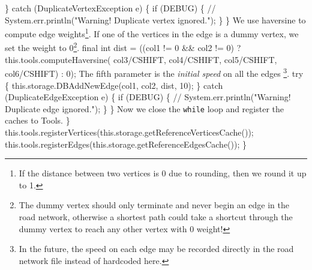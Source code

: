 \} catch (DuplicateVertexException e) \{
  if (DEBUG) \{
    // System.err.println("Warning! Duplicate vertex ignored.");
  \}
\}
\nwendcode{}\nwdocspar
{\small We use haversine to compute edge weights\footnote{If the distance between two
vertices is 0 due to rounding, then we round it up to 1.}.  If one of the
vertices in the edge is a dummy vertex, we set the weight to 0\footnote{The
dummy vertex should only terminate and never begin an edge in the road network,
otherwise a shortest path could take a shortcut through the dummy vertex to
reach any other vertex with 0 weight!}.}
\nwenddocs{}\plusendmoddef
final int dist = ((col1 != 0 && col2 != 0)
  ? this.tools.computeHaversine(
        col3/CSHIFT, col4/CSHIFT,
        col5/CSHIFT, col6/CSHIFT) : 0);
\nwendcode{}\nwdocspar
{\small The fifth parameter is the \textit{initial speed} on all the edges
\footnote{In the future, the speed on each edge may be recorded directly in the
road network file instead of hardcoded here.}.}
\nwenddocs{}\plusendmoddef
try \{
  this.storage.DBAddNewEdge(col1, col2, dist, 10);
\} catch (DuplicateEdgeException e) \{
  if (DEBUG) \{
    // System.err.println("Warning! Duplicate edge ignored.");
  \}
\}
\nwendcode{}\nwdocspar
{\small Now we close the {\tt{}while} loop and register the caches to Tools.}
\nwenddocs{}\plusendmoddef
  \}
  this.tools.registerVertices(this.storage.getReferenceVerticesCache());
  this.tools.registerEdges(this.storage.getReferenceEdgesCache());
\}
\nwendcode{}

